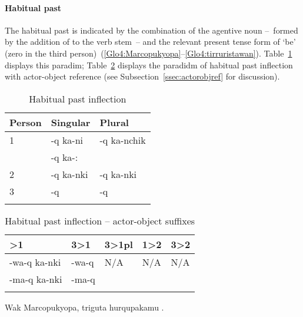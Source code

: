 \paragraph{Habitual past }\label{par:iterative}
The habitual past is indicated by the combination of the agentive noun --~formed by the addition of  to the verb stem~-- and the relevant present tense form of  ‘be’ (zero in the third person)~(\ref{Glo4:Marcopukyopa}--\ref{Glo4:tirruristawan}). Table~\ref{Tab20a} displays this paradim; Table~\ref{Tab20b} displays the paradidm of habitual past inflection with actor-object reference (see Subsection~\ref{ssec:actorobjref} for discussion).

\begin{table}
\small\centering
\caption{Habitual past inflection}\label{Tab20a}
\begin{tabular}{lll}
\lsptoprule
Person		& Singular		& Plural	\\
\midrule
1	& -q ka-ni\tss{\AMV,\LT}	& -q ka-nchik	\\
	& -q ka-:\tss{\ACH,\CH,\SP}	&				\\[2ex]
2	&	-q ka-nki				&-q ka-nki		\\[2ex]
3	&	-q						&-q				\\
\lspbottomrule
\end{tabular}
\end{table}

\begin{table}
\small\centering
\caption{Habitual past inflection -- actor-object suffixes}\label{Tab20b}
\begin{tabular}{lllll}
\lsptoprule
2>1		& 3>1		& 3>1pl	& 1>2	& 3>2	\\
\midrule
-wa-q ka-nki\tss{\AMV,\LT}	&	-wa-q\tss{\AMV,\LT}	&	N/A	&	N/A	&	N/A	\\
-ma-q ka-nki\tss{\ACH,\CH,\SP}	&	-ma-q\tss{\ACH,\CH,\SP}	&	 	&	 	&	 	\\
\lspbottomrule
\end{tabular}
\end{table}

%
{Wak Marcopukyopa, triguta hurqupakamu .}%
{}%
{}{}%

